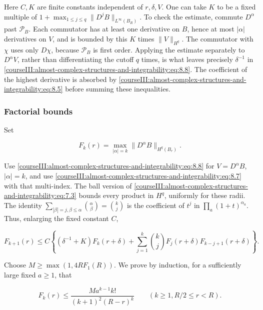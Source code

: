 Here \(C,K\) are finite constants independent of \(r,\delta,V\). One can take \(K\) to be a fixed multiple of \(1+\max_{1\leq j\leq q}\|D^jB\|_{L^\infty(B_R)}\). To check the estimate, commute \(D^\alpha\) past \(\mathcal P_B\). Each commutator has at least one derivative on \(B\), hence at most \(|\alpha|\) derivatives on \(V\), and is bounded by this \(K\) times \(\|V\|_{H^q}\). The commutator with \(\chi\) uses only \(D\chi\), because \(\mathcal P_B\) is first order. Applying the estimate separately to \(D^\alpha V\), rather than differentiating the cutoff \(q\) times, is what leaves precisely \(\delta^{-1}\) in \eqref{courseIII:almost-complex-structures-and-integrability:eq:8.8}. The coefficient of the highest derivative is absorbed by \eqref{courseIII:almost-complex-structures-and-integrability:eq:8.5} before summing these inequalities.

\subsubsection{Factorial bounds}
\label{courseIII:almost-complex-structures-and-integrability:section-8.3}

Set

\begin{equation}
F_k(r)=\max_{|\alpha|=k}\|D^\alpha B\|_{H^q(B_r)}.
\label{courseIII:almost-complex-structures-and-integrability:eq:8.9}
\end{equation}

Use \eqref{courseIII:almost-complex-structures-and-integrability:eq:8.8} for \(V=D^\alpha B\), \(|\alpha|=k\), and use \eqref{courseIII:almost-complex-structures-and-integrability:eq:8.7} with that multi-index. The ball version of \eqref{courseIII:almost-complex-structures-and-integrability:eq:7.3} bounds every product in \(H^q\), uniformly for these radii. The identity
\(\sum_{|\beta|=j,\beta\leq\alpha}\binom\alpha\beta=\binom kj\)
is the coefficient of \(t^j\) in \(\prod_a(1+t)^{\alpha_a}\). Thus, enlarging the fixed constant \(C\),

\begin{equation}
F_{k+1}(r)\leq C\left\{
(\delta^{-1}+K)F_k(r+\delta)
+\sum_{j=1}^k\binom kjF_j(r+\delta)F_{k-j+1}(r+\delta)
\right\}.
\label{courseIII:almost-complex-structures-and-integrability:eq:8.10}
\end{equation}

Choose \(M\geq\max(1,4R F_1(R))\). We prove by induction, for a sufficiently large fixed \(a\geq1\), that

\begin{equation}
F_k(r)\leq
\frac{M a^{k-1}k!}{(k+1)^2(R-r)^k}
\qquad(k\geq1, R/2\leq r<R).
\label{courseIII:almost-complex-structures-and-integrability:eq:8.11}
\end{equation}

